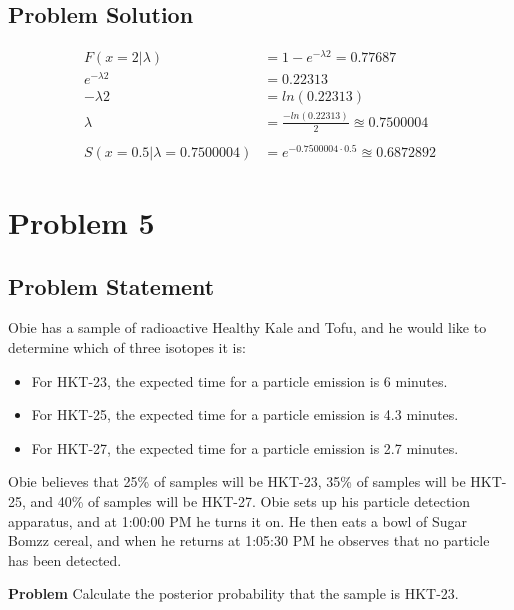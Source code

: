 \documentclass[12pt]{article}
\theoremstyle{definition}
\begin{document}
\subsection*{Problem Solution}
\begin{align*}
F(x=2|\lambda) &= 1- e^{-\lambda 2} = 0.77687\\
e^{-\lambda 2} &= 0.22313\\
-\lambda 2 &= ln(0.22313)\\
\lambda &= \frac{-ln(0.22313)}{2} \approxeq 0.7500004\\\\
S(x=0.5|\lambda=0.7500004) &= e^{-0.7500004 \cdot 0.5} \approxeq 0.6872892
\end{align*}



\newpage
\section*{Problem 5}

\subsection*{Problem Statement}

Obie has a sample of radioactive Healthy Kale and Tofu, and he would like to determine which of three isotopes it is:
\begin{itemize}
	\item For HKT-23, the expected time for a particle emission is 6 minutes.
	\item For HKT-25, the expected time for a particle emission is 4.3 minutes.
	\item For HKT-27, the expected time for a particle emission is 2.7 minutes.
\end{itemize}
Obie believes that 25\% of samples will be HKT-23, 35\% of samples will be HKT-25, and 40\% of samples will be HKT-27.
Obie sets up his particle detection apparatus, and at 1:00:00 PM he turns it on. He then eats a bowl of Sugar Bomzz cereal, and when he returns at 1:05:30 PM he observes that no particle has been detected.

\bigskip
\noindent
{\bf Problem} Calculate the posterior probability that the sample is HKT-23.
\end{document}

